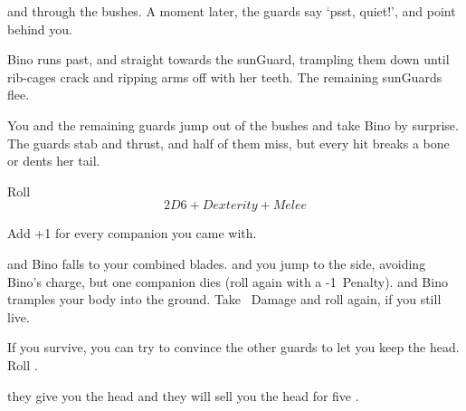 and through the bushes.
A moment later, the \glspl{guard} say `psst, quiet!', and point behind you.

Bino runs past, and straight towards the \gls{sunGuard}, trampling them down until rib-cages crack and ripping arms off with her teeth.
The remaining \glspl{sunGuard} flee.

You and the remaining \glspl{guard} jump out of the bushes and take Bino by surprise.
The \glspl{guard} stab and thrust, and half of them miss, but every hit breaks a bone or dents her tail.

Roll $$2D6 + Dexterity + Melee$$

Add +1 for every companion you came with.

\begin{selectPath}
  {and Bino falls to your combined blades.}%
  {}
  {and you jump to the side, avoiding Bino's charge, but one companion dies (roll again with a -1~Penalty).}%
  {}%
  {and Bino tramples your body into the ground.
  Take ~Damage and roll again, if you still live.}%
  {}%
\end{selectPath}

If you survive, you can try to convince the other \glspl{guard} to let you keep the head.
Roll .

\begin{selectPath}
  {they give you the head}%
  {}
  {and they will sell you the head for five .}%
  {}%
\end{selectPath}

